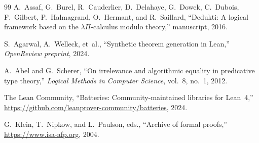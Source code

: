 \begin{thebibliography}{99}
  A.~Assaf, G.~Burel, R.~Cauderlier, D.~Delahaye, G.~Dowek,
  C.~Dubois, F.~Gilbert, P.~Halmagrand, O.~Hermant, and R.~Saillard,
  ``Dedukti: A logical framework based on the $\lambda\Pi$-calculus
  modulo theory,'' manuscript, 2016.

  S.~Agarwal, A.~Welleck, et~al.,
  ``Synthetic theorem generation in Lean,''
  \emph{OpenReview preprint}, 2024.

  A.~Abel and G.~Scherer,
  ``On irrelevance and algorithmic equality in predicative type theory,''
  \emph{Logical Methods in Computer Science}, vol.~8, no.~1, 2012.

  The Lean Community,
  ``Batteries: Community-maintained libraries for Lean~4,''
  \url{https://github.com/leanprover-community/batteries}, 2024.

  G.~Klein, T.~Nipkow, and L.~Paulson, eds.,
  ``Archive of formal proofs,''
  \url{https://www.isa-afp.org}, 2004.

\end{thebibliography}

